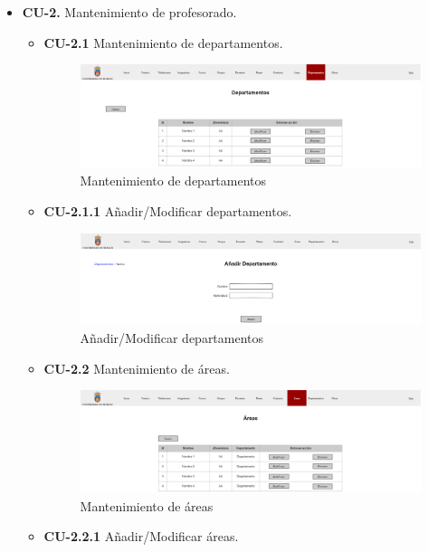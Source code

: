 \begin{itemize}
\newpage	
	\item \textbf{CU-2.} Mantenimiento de profesorado.
	\begin{itemize}
		\item \textbf{CU-2.1} Mantenimiento de departamentos.
		\begin{figure}[!h]
		\centering
		\includegraphics[width=\textwidth]{../img/Anexos/Vistas/departamentos.png}
		\caption{Mantenimiento de departamentos}
		\end{figure}
		\FloatBarrier
		\item \textbf{CU-2.1.1} Añadir/Modificar departamentos.
		\begin{figure}[!h]
		\centering
		\includegraphics[width=\textwidth]{../img/Anexos/Vistas/add_departamento.png}
		\caption{Añadir/Modificar departamentos}
		\end{figure}
		\FloatBarrier
\newpage
		\item \textbf{CU-2.2} Mantenimiento de áreas.
		\begin{figure}[!h]
		\centering
		\includegraphics[width=\textwidth]{../img/Anexos/Vistas/areas.png}
		\caption{Mantenimiento de áreas}
		\end{figure}
		\FloatBarrier
		\item \textbf{CU-2.2.1} Añadir/Modificar áreas.
		\begin{figure}[!h]

\end{figure}
\end{itemize}
\end{itemize}
